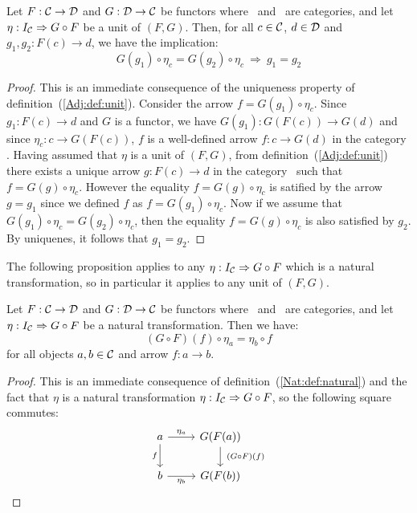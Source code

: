 \begin{prop}\label{Adj:prop:unit:proving:equality}
    Let $F:\mbox{$\cal C$}\to\mbox{$\cal D$}$ and $G:\mbox{$\cal D$}\to\mbox{$\cal C$}$ be functors where \Cat\ and \Dat\ 
    are categories, and let $\eta:I_{\cal C}\Rightarrow G\circ F$ be a unit 
    of $(F,G)$. Then, for all $c\in\mbox{$\cal C$}$, $d\in\mbox{$\cal D$}$ and $g_{1},g_{2}:F(c)\to d$,
    we have the implication:
        \[
            G(g_{1})\circ\eta_{c} = G(g_{2})\circ\eta_{c}\ 
            \Rightarrow\ 
            g_{1}=g_{2}
        \]
\end{prop}
\begin{proof}
    This is an immediate consequence of the uniqueness property of
    definition~(\ref{Adj:def:unit}). Consider the arrow 
    $f=G(g_{1})\circ\eta_{c}$. Since $g_{1}:F(c)\to d$ and $G$ is a 
    functor, we have 
    $G(g_{1}):G(F(c))\to G(d)$ and since $\eta_{c}:c\to G(F(c))$, $f$
    is a well-defined arrow $f:c\to G(d)$ in the category \Cat. Having
    assumed that $\eta$ is a unit of $(F,G)$, from 
    definition~(\ref{Adj:def:unit}) there exists a unique arrow 
    $g:F(c)\to d$ in the category \Dat\ such that $f=G(g)\circ\eta_{c}$.
    However the equality $f=G(g)\circ\eta_{c}$ is satified by the 
    arrow $g=g_{1}$ since we defined $f$ as $f=G(g_{1})\circ\eta_{c}$.
    Now if we assume that $G(g_{1})\circ\eta_{c}=G(g_{2})\circ\eta_{c}$,
    then the equality $f=G(g)\circ\eta_{c}$ is also satisfied by $g_{2}$.
    By uniquenes, it follows that $g_{1}=g_{2}$.
\end{proof}

The following proposition applies to any $\eta:I_{\cal C}\Rightarrow G\circ F$ 
which is a natural transformation, so in particular it applies to any unit of
$(F,G)$.
\begin{prop}\label{Adj:prop:unit:natural}
    Let $F:\mbox{$\cal C$}\to\mbox{$\cal D$}$ and $G:\mbox{$\cal D$}\to\mbox{$\cal C$}$ be functors where \Cat\ and \Dat\ 
    are categories, and let $\eta:I_{\cal C}\Rightarrow G\circ F$ be a
    natural transformation. Then we have:
        \[
            (G\circ F)(f)\circ\eta_{a}=\eta_{b}\circ f
        \]
    for all objects $a,b\in\mbox{$\cal C$}$ and arrow $f:a\to b$.
\end{prop}
\begin{proof}
    This is an immediate consequence of definition~(\ref{Nat:def:natural}) 
    and the fact that $\eta$ is a natural transformation 
    $\eta:I_{\cal C}\Rightarrow G\circ F$, so the following square commutes:
    \[
        \begin{tikzcd}
            a\arrow[r, "\eta_{a}"]\arrow[d, swap,"f"]
            &G(F(a))\arrow[d, "\ (G\circ F)(f)"]
            \\
            b\arrow[r, swap, "\eta_{b}"]
            &G(F(b))
        \end{tikzcd}
    \]
\end{proof}

